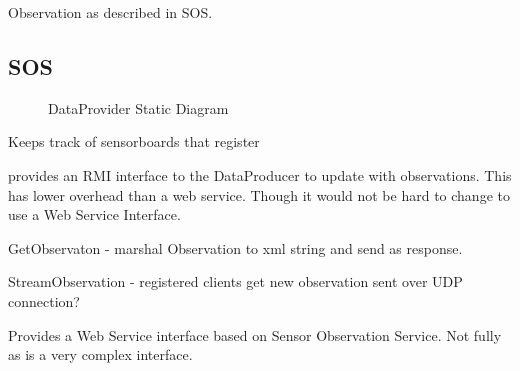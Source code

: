 \documentclass[]{final_report}
\begin{document}
Observation as described in SOS.


\subsection {SOS}
 \begin{figure}[h]
\caption{DataProvider Static Diagram}\label{fig:bon_static_diagam_provider.png}
\end{figure}
Keeps track of sensorboards that register

provides an RMI interface to the DataProducer to update with observations. This has lower overhead
than a web service. Though it would not be hard to change to use a Web Service Interface.

GetObservaton - marshal Observation to xml string and send as response.

StreamObservation -  registered clients get new observation sent over UDP connection?

Provides a Web Service interface  based on Sensor Observation Service. Not fully as is a very complex interface.
\end{document}
